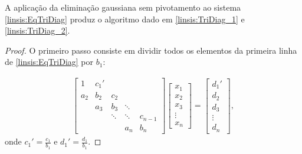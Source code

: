 \begin{teo} A aplicação da eliminação gaussiana sem pivotamento ao sistema \eqref{linsis:EqTriDiag} produz o algoritmo dado em \eqref{linsis:TriDiag_1} e \eqref{linsis:TriDiag_2}.
\end{teo}
\begin{proof}
O primeiro passo consiste em dividir todos os elementos da primeira linha de \eqref{linsis:EqTriDiag} por $b_1$:

\begin{eqnarray} \begin{bmatrix}
   {1} & {c_1'} & {   } & {   } & {   } \\
   {a_2} & {b_2} & {c_2} & {   } & {   } \\
   {   } & {a_3} & {b_3} & \ddots & {   } \\
   {   } & {   } & \ddots & \ddots & {c_{n-1}}\\
   {   } & {   } & {   } & {a_n} & {b_n}
\end{bmatrix}
\begin{bmatrix}
   {x_1 }  \\
   {x_2 }  \\
   {x_3 }  \\
   \vdots   \\
   {x_n }
\end{bmatrix}
=
\begin{bmatrix}
   {d_1' }  \\
   {d_2 }  \\
   {d_3 }  \\
   \vdots   \\
   {d_n }
\end{bmatrix},
\end{eqnarray}
onde $c_1'=\frac{c_1}{b_1}$ e $d_1'=\frac{d_1}{b_1}.$


\end{proof}
